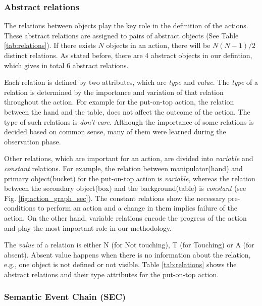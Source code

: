 \subsubsection{Abstract relations}

The relations between objects play the key role in the definition of the actions.
These abstract relations are assigned to pairs of abstract objects (See Table \ref{tab:relations}).
If there exists $N$ objects in an action,
there will be $N(N-1)/2$ distinct relations.
As stated before, there are 4 abstract objects in our defintion, which gives in total 6 abstract relations.


Each relation is defined by two attributes, which are  \emph{type} and \emph{value}.
The \emph{type} of a relation is determined by the importance and variation of that relation throughout the action.
For example for the put-on-top action, the relation between the hand and the table, does not affect the outcome of the action.
The type of such relations is \emph{don't-care}.
Although the importance of some relations is decided based on common sense, many of them were learned during the observation phase.

Other relations, which are important for an action, are divided into \emph{variable} and \emph{constant} relations.
For example, the relation between manipulator(hand) and primary object(bucket) for the put-on-top action is \emph{variable},
whereas the relation between the secondary object(box) and the background(table) is \emph{constant} (see Fig. \ref{fig:action_graph_sec}).
The constant relations show the necessary pre-conditions to perform an action and a change in them implies failure of the action.
On the other hand, variable relations encode the progress of the action and play the most important role in our methodology.

The \emph{value} of a relation is either N (for Not touching), T (for Touching) or A (for absent).
Absent value happens when there is no information about the relation, e.g., one object is not defined or not visible.
Table \ref{tab:relations} shows the abstract relations and their type attributes for the put-on-top action.



\subsubsection{Semantic Event Chain (SEC)}
\label{sec:SEC}

